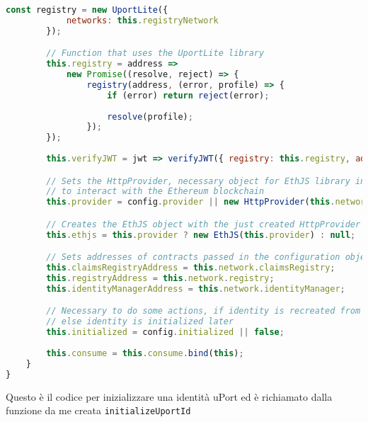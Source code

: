 \begin{lstlisting}[language=JavaScript]
        const registry = new UportLite({
            networks: this.registryNetwork
        });

        // Function that uses the UportLite library
        this.registry = address =>
            new Promise((resolve, reject) => {
                registry(address, (error, profile) => {
                    if (error) return reject(error);
        
                    resolve(profile);
                });
        });
    
        this.verifyJWT = jwt => verifyJWT({ registry: this.registry, address: this.mnid }, jwt);

        // Sets the HttpProvider, necessary object for EthJS library in order 
        // to interact with the Ethereum blockchain
        this.provider = config.provider || new HttpProvider(this.network.rpcUrl);

        // Creates the EthJS object with the just created HttpProvider as a parameter
        this.ethjs = this.provider ? new EthJS(this.provider) : null;

        // Sets addresses of contracts passed in the configuration object
        this.claimsRegistryAddress = this.network.claimsRegistry;
        this.registryAddress = this.network.registry;
        this.identityManagerAddress = this.network.identityManager;

        // Necessary to do some actions, if identity is recreated from MongoDB config.initialized has a value,
        // else identity is initialized later
        this.initialized = config.initialized || false;
    
        this.consume = this.consume.bind(this);
    }
}
\end{lstlisting}

Questo è il codice per inizializzare una identità uPort ed è richiamato dalla funzione da me creata \texttt{initializeUportId}

